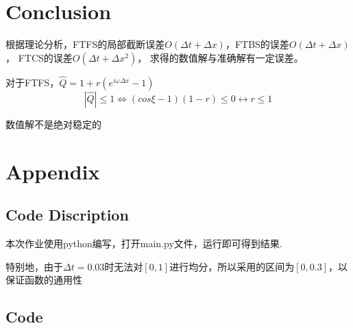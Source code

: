 \documentclass{article}
\begin{document}
\section{Conclusion}
根据理论分析，FTFS的局部截断误差$O(\Delta t+\Delta x)$，FTBS的误差$O(\Delta t+\Delta x)$，
FTCS的误差$O(\Delta t+\Delta x^2)$，
求得的数值解与准确解有一定误差。

对于FTFS，$\hat{Q}=1+r(e^{i\omega \Delta x}-1)$
$$|\hat{Q}|\leq 1\Leftrightarrow (cos\xi-1)(1-r)\leq 0\leftrightarrow r\leq 1$$

数值解不是绝对稳定的

\section{Appendix}
\subsection{Code Discription}

本次作业使用python编写，打开main.py文件，运行即可得到结果.

特别地，由于$\Delta t=0.03$时无法对$[0,1]$进行均分，所以采用的区间为$[0,0.3]$，以保证函数的通用性

\subsection{Code}

\end{document}
